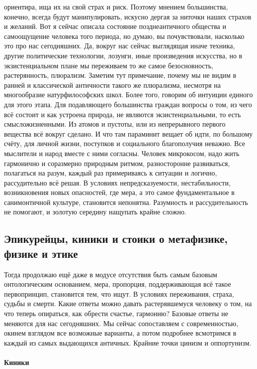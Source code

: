 ориентира, ища их на свой страх и риск. Поэтому мнением большинства, конечно,
всегда будут манипулировать, искусно дергая за ниточки наших страхов и желаний.
Вот я сейчас описала состояние позднеантичного общества и самоощущение человека
того периода, но думаю, вы почувствовали, насколько это про нас сегодняшних. Да,
вокруг нас сейчас выглядящая иначе техника, другие политические технологии,
лозунги, иные произведения искусства, но в экзистенциальном плане мы переживаем
то же самое безосновность, растерянность, плюрализм. Заметим тут примечание,
почему мы не видим в ранней и классической античности такого же плюрализма,
несмотря на многообразие натурфилософских школ. Более того, говорим об интуиции
единого для этого этапа. Для подавляющего большинства граждан вопросы о том, из
чего всё состоит и как устроена природа, не являются экзистенциальными, то есть
смысложизненными. Из атомов и пустоты, или из непрерывного первого вещества всё
вокруг сделано. И что там параминит вещает об идти, по большому счёту, для
личной жизни, поступков и социального благополучия неважно. Все мыслители и
народ вместе с ними согласны. Человек микрокосом, надо жить гармонично и
соразмерно природным ритмом, разносторонне развиваться, полагаться на разум,
каждый раз примериваясь к ситуации и логично, рассудительно всё решая. В
условиях непредсказуемости, нестабильности, возникновения новых опасностей, где
мера, а это самое фундаментальное в санимонтичной культуре, становится
непонятна. Разумность и рассудительность не помогают, и золотую середину
нащупать крайне сложно. 

\subsection{Эпикурейцы, киники и стоики о метафизике, физике и этике}

Тогда продолжаю ещё даже в модусе отсутствия быть самым
базовым онтологическим основанием, мера, пропорция, поддерживающая всё такое
первопринцип, становится тем, что ищут. В условиях переживания, страха, судьбы и
смерти. Какие ответы можно давать растерявшемуся человеку о том, на что теперь
опираться, как обрести счастье, гармонию? Базовые ответы не меняются для нас
сегодняшних. Мы сейчас сопоставляем с современностью, окинем взглядом все
возможные варианты, а потом подробнее всмотримся в каждый из самых выдающихся
античных. Крайние точки цинизм и оппортунизм. 

\paragraph{Киники}

